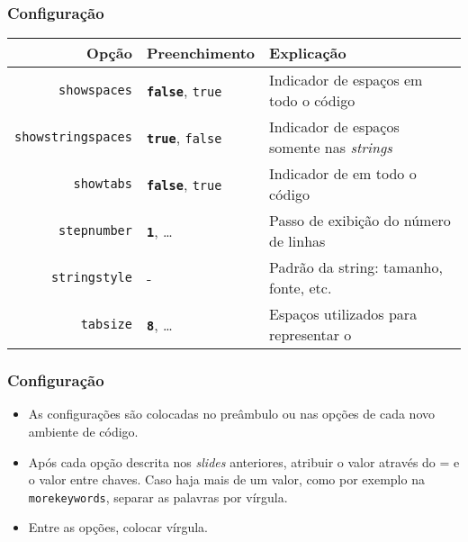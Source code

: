 \documentclass[brazilian]{beamer}
\begin{document}
\begin{frame}[fragile]
\end{frame}

\begin{frame}[fragile]
    \frametitle{Configuração}
\tiny
    \begin{table}
        \begin{tabular}{rC{2cm}O{6cm}}
            Opção & Preenchimento & Explicação \\ \hline
            \texttt{showspaces} & \texttt{\bfseries false}, \texttt{true} & Indicador de espaços em todo o código \\ \hline
            \texttt{showstringspaces} & \texttt{\bfseries true}, \texttt{false} & Indicador de espaços somente nas \textit{strings} \\ \hline
            \texttt{showtabs} & \texttt{\bfseries false}, \texttt{true} & Indicador de \keys{\tab} em todo o código \\ \hline
            \texttt{stepnumber} & \texttt{\bfseries 1}, \ldots & Passo de exibição do número de linhas \\ \hline
            \texttt{stringstyle} & - & Padrão da string: tamanho, fonte, etc. \\ \hline
            \texttt{tabsize} & \texttt{\bfseries 8}, \ldots & Espaços utilizados para representar o \keys{\tab} \\ \hline
        \end{tabular}
    \end{table}
\end{frame}

\begin{frame}
    \frametitle{Configuração}

    \begin{itemize}
        \item As configurações são colocadas no preâmbulo ou nas opções de cada novo ambiente de código.
        \item Após cada opção descrita nos \textit{slides} anteriores, atribuir o valor através do = e o valor entre chaves. Caso haja mais de um valor, como por exemplo na \texttt{morekeywords}, separar as palavras por vírgula.
        \item Entre as opções, colocar vírgula.
    \end{itemize}

\end{frame}
\end{document}
